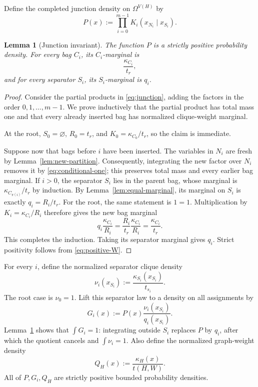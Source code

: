 \documentclass[11pt]{article}
\newtheorem{lemma}{Lemma}
\begin{document}
Define the completed junction density on \(\Omega^{V(H)}\) by
\begin{equation}\label{eq:junction}
    P(x)
    :=
    \prod_{i=0}^{m-1}K_i(x_{N_i}\mid x_{S_i}).
\end{equation}

\begin{lemma}[Junction invariant]\label{lem:junction}
The function \(P\) is a strictly positive probability density.  For every
bag \(C_i\), its \(C_i\)-marginal is
\[
    \frac{\kappa_{C_i}}{t_r},
\]
and for every separator \(S_i\), its \(S_i\)-marginal is \(q_i\).
\end{lemma}

\begin{proof}
Consider the partial products in \eqref{eq:junction}, adding the factors in
the order \(0,1,\dots,m-1\).  We prove inductively that the partial product
has total mass one and that every already inserted bag has normalized
clique-weight marginal.

At the root, \(S_0=\varnothing\), \(R_0=t_r\), and
\(K_0=\kappa_{C_0}/t_r\), so the claim is immediate.

Suppose now that bags before \(i\) have been inserted.  The variables in
\(N_i\) are fresh by Lemma~\ref{lem:new-partition}.  Consequently,
integrating the new factor over \(N_i\) removes it by
\eqref{eq:conditional-one}; this preserves total mass and every earlier bag
marginal.  If \(i>0\), the separator \(S_i\) lies in the parent bag, whose
marginal is \(\kappa_{C_{\pi(i)}}/t_r\) by induction.  By
Lemma~\ref{lem:equal-marginal}, its marginal on \(S_i\) is exactly
\(q_i=R_i/t_r\).  For the root, the same statement is \(1=1\).
Multiplication by \(K_i=\kappa_{C_i}/R_i\) therefore gives the new bag
marginal
\[
    q_i\frac{\kappa_{C_i}}{R_i}
    =
    \frac{R_i}{t_r}\frac{\kappa_{C_i}}{R_i}
    =
    \frac{\kappa_{C_i}}{t_r}.
\]
This completes the induction.  Taking its separator marginal gives \(q_i\).
Strict positivity follows from \eqref{eq:positive-W}.
\end{proof}

For every \(i\), define the normalized separator clique density
\[
    \nu_i(x_{S_i})
    :=
    \frac{\kappa_{S_i}(x_{S_i})}{t_{s_i}}.
\]
The root case is \(\nu_0=1\).  Lift this separator law to a density on all
assignments by
\[
    G_i(x)
    :=
    P(x)\frac{\nu_i(x_{S_i})}{q_i(x_{S_i})}.
\]
Lemma~\ref{lem:junction} shows that \(\int G_i=1\): integrating outside
\(S_i\) replaces \(P\) by \(q_i\), after which the quotient cancels and
\(\int\nu_i=1\).  Also define the normalized graph-weight density
\[
    Q_H(x):=\frac{\kappa_H(x)}{t(H,W)}.
\]
All of \(P,G_i,Q_H\) are strictly positive bounded probability densities.
\end{document}
